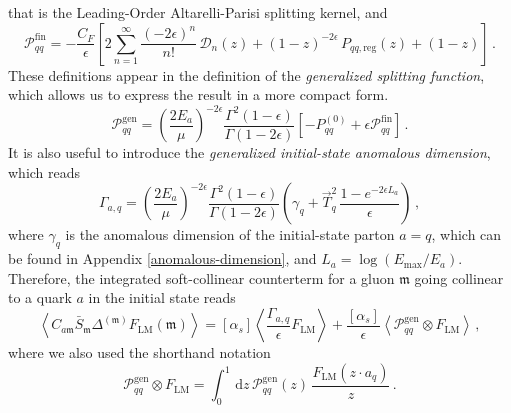 \documentclass[a4paper, 12pt]{book}
\newcommand{\um}{\mathfrak{m}}
\begin{document}
that is the Leading-Order Altarelli-Parisi splitting kernel, and
\begin{equation}
  \mathcal{P}_{qq}^{\mathrm{fin}}= - \frac{C_F}{\epsilon} \left[2 \sum_{n=1}^{\infty} \frac{(-2\epsilon)^n}{n!} \, \mathcal{D}_n(z)+(1-z)^{-2\epsilon} \, P_{qq, \mathrm{reg}}(z)+(1-z) \right] \, .
\end{equation}
These definitions appear in the definition of the \emph{generalized splitting function}, which allows us to express the result in a more compact form. 
\begin{equation}
  \mathcal{P}_{qq}^{\mathrm{gen}} = \left(\frac{2E_a}{\mu}\right)^{-2\epsilon} \frac{\Gamma^2(1-\epsilon)}{\Gamma(1-2\epsilon)} \left[-P^{(0)}_{qq}+\epsilon \mathcal{P}_{qq}^{\mathrm{fin}}\right] \, .
  \label{gen-splitt-funct}
\end{equation}
It is also useful to introduce the \emph{generalized initial-state anomalous dimension}, which reads
\begin{equation}
  \Gamma_{a,q} = \left(\frac{2E_a}{\mu}\right)^{-2\epsilon} \frac{\Gamma^2(1-\epsilon)}{\Gamma(1-2\epsilon)} \left(\gamma_q + \vec{T}_q^2 \,\frac{1-e^{-2\epsilon L_a}}{\epsilon}\right) \, ,
  \label{generalized-anom-dim-in}
\end{equation}
where $\gamma_q$ is the anomalous dimension of the initial-state parton $a=q$, which can be found in Appendix \ref{anomalous-dimension}, and $L_a =\log{(E_{\mathrm{max}}/E_a)}$. Therefore, the integrated soft-collinear counterterm for a gluon $\um$ going collinear to a quark $a$ in the initial state reads
\begin{equation}
  \left< C_{a\um} \bar{S}_\um \Delta^{(\um)} F_{\mathrm{LM}} (\um) \right> = [\alpha_s] \left< \frac{\Gamma_{a,q}}{\epsilon} F_{\mathrm{LM}} \right> + \frac{[\alpha_s]}{\epsilon}\left< \mathcal{P}_{qq}^{\mathrm{gen}} \otimes F_{\mathrm{LM}} \right> \, ,
  \label{initial-state-collinear}
\end{equation}
where we also used the shorthand notation
\begin{equation}
  \mathcal{P}_{qq}^{\mathrm{gen}} \otimes F_{\mathrm{LM}} = \int_0^1 \, \mathrm{d}z \, \mathcal{P}_{qq}^{\mathrm{gen}}(z) \, \frac{F_{\mathrm{LM}}(z \cdot a_q)}{z} \, .
  \label{convolution}
\end{equation}
\\
\end{document}
